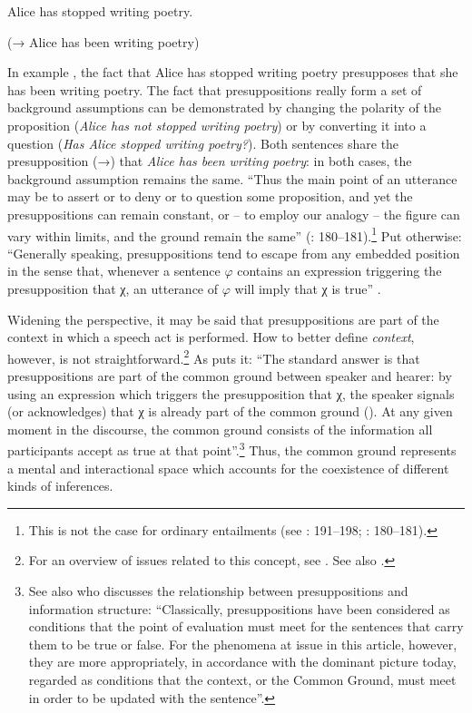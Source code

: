 \ea%
    \label{ex:key:6}

          Alice has stopped writing poetry.

(→ Alice has been writing poetry)
    \z %

In example , the fact that Alice has stopped writing poetry presupposes that she has been writing poetry. The fact that presuppositions really form a set of background assumptions can be demonstrated by changing the polarity of the proposition (\textit{Alice has not stopped writing poetry}) or by converting it into a question (\textit{Has Alice stopped writing poetry?}). Both sentences share the presupposition (→) that \textit{Alice has been writing poetry}: in both cases, the background assumption remains the same. “Thus the main point of an utterance may be to assert or to deny or to question some proposition, and yet the presuppositions can remain constant, or – to employ our analogy – the figure can vary within limits, and the ground remain the same” (\citealt{Levinson1983}: 180–181).\footnote{This is not the case for ordinary entailments (see \citealt{Levinson1983}: 191–198; \citealt{Geurts2017}: 180–181).}  Put otherwise: “Generally speaking, presuppositions tend to escape from any embedded position in the sense that, whenever a sentence $\varphi $ contains an expression triggering the presupposition that χ, an utterance of $\varphi $ will imply that χ is true” \citep[181]{Geurts2017}.

Widening the perspective, it may be said that presuppositions are part of the context in which a speech act is performed. How to better define \textit{context}, however, is not straightforward.\footnote{For an overview of issues related to this concept, see \citet{Fetzer2017}. See also \citet{FetzerFischer2007}.} As \citet[182]{Geurts2017} puts it: “The standard answer is that presuppositions are part of the common ground between speaker and hearer: by using an expression which triggers the presupposition that χ, the speaker signals (or acknowledges) that χ is already part of the common ground (\citealt{Stalnaker1973,Stalnaker1974}). At any given moment in the discourse, the common ground consists of the information all participants accept as true at that point”.\footnote{See also \citet[128]{Sæbø2016} who discusses the relationship between presuppositions and information structure: “Classically, presuppositions have been considered as conditions that the point of evaluation must meet for the sentences that carry them to be true or false. For the phenomena at issue in this article, however, they are more appropriately, in accordance with the dominant picture today, regarded as conditions that the context, or the Common Ground, must meet in order to be updated with the sentence”.} Thus, the common ground represents a mental and interactional space which accounts for the coexistence of different kinds of inferences.

